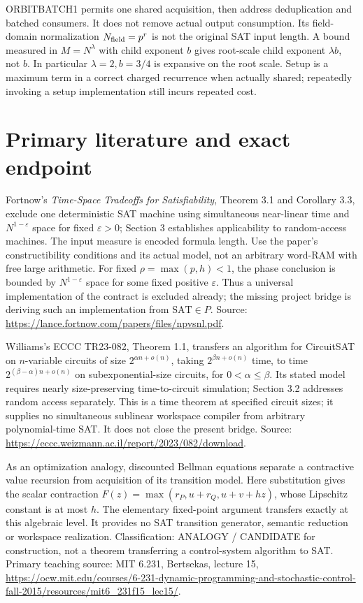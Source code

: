 \documentclass[11pt]{article}
\begin{document}
ORBITBATCH1 permits one shared acquisition, then address deduplication
and batched consumers. It does not remove actual output consumption.
Its field-domain normalization $N_{\rm field}=p^r$ is not the original
SAT input length. A bound measured in $M=N^\lambda$ with child exponent
$b$ gives root-scale child exponent $\lambda b$, not $b$. In particular
$\lambda=2,b=3/4$ is expansive on the root scale. Setup is a maximum
term in a correct charged recurrence when actually shared; repeatedly
invoking a setup implementation still incurs repeated cost.

\section*{Primary literature and exact endpoint}
Fortnow's \emph{Time-Space Tradeoffs for Satisfiability}, Theorem 3.1 and
Corollary 3.3, exclude one deterministic SAT machine using simultaneous
near-linear time and $N^{1-\varepsilon}$ space for fixed $\varepsilon>0$;
Section 3 establishes applicability to random-access machines. The input
measure is encoded formula length. Use the paper's constructibility
conditions and its actual model, not an arbitrary word-RAM with free
large arithmetic. For fixed $\rho=\max(p,h)<1$, the phase conclusion is
bounded by $N^{1-\varepsilon}$ space for some fixed positive $\varepsilon$.
Thus a universal implementation of the contract is excluded already;
the missing project bridge is deriving such an implementation from
$\mathrm{SAT}\in P$.
Source: \url{https://lance.fortnow.com/papers/files/npvsnl.pdf}.

Williams's ECCC TR23-082, Theorem 1.1, transfers an algorithm for CircuitSAT
on $n$-variable circuits of size $2^{\alpha n+o(n)}$, taking
$2^{\beta n+o(n)}$ time, to time $2^{(\beta-\alpha)n+o(n)}$ on
subexponential-size circuits, for $0<\alpha\le\beta$. Its stated model
requires nearly size-preserving time-to-circuit simulation; Section 3.2
addresses random access separately. This is a time theorem at specified
circuit sizes; it supplies no simultaneous sublinear workspace compiler
from arbitrary polynomial-time SAT. It does not close the present bridge.
Source: \url{https://eccc.weizmann.ac.il/report/2023/082/download}.

As an optimization analogy, discounted Bellman equations separate a
contractive value recursion from acquisition of its transition model.
Here substitution gives the scalar contraction
$F(z)=\max(r_P,u+r_Q,u+v+hz)$, whose Lipschitz constant is at most $h$.
The elementary fixed-point argument transfers exactly at this algebraic
level. It provides no SAT transition generator, semantic reduction or
workspace realization. Classification: ANALOGY / CANDIDATE for construction,
not a theorem transferring a control-system algorithm to SAT.
Primary teaching source: MIT 6.231, Bertsekas, lecture 15,
\url{https://ocw.mit.edu/courses/6-231-dynamic-programming-and-stochastic-control-fall-2015/resources/mit6_231f15_lec15/}.
\end{document}
